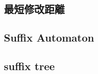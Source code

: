 \subsection{最短修改距離}
\raggedbottom
\hrulefill
\subsection{Suffix Automaton}
\raggedbottom
\hrulefill
\subsection{suffix tree}
\raggedbottom
\hrulefill

